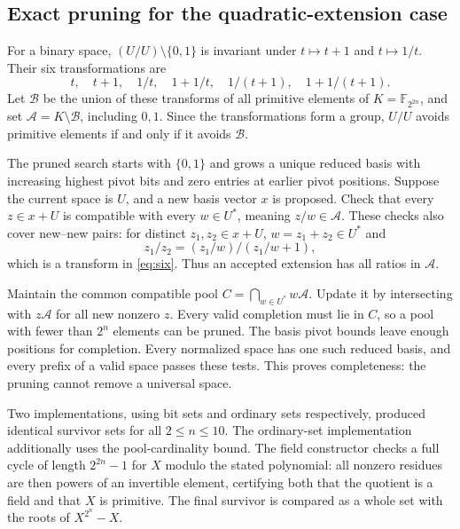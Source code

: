 \documentclass[11pt,a4paper]{article}
\theoremstyle{definition}\newtheorem{definition}[theorem]{Definition}
\theoremstyle{remark}\newtheorem{remark}[theorem]{Remark}
\newcommand{\F}{\mathbb F}
\numberwithin{equation}{section}
\begin{document}
\subsection{Exact pruning for the quadratic-extension case}
For a binary space, $(U/U)\setminus\{0,1\}$ is invariant under $t\mapsto t+1$ and $t\mapsto1/t$. Their six transformations are
\begin{equation}\label{eq:six}
t,\quad t+1,\quad1/t,\quad1+1/t,\quad1/(t+1),\quad1+1/(t+1).
\end{equation}
Let $\mathcal B$ be the union of these transforms of all primitive elements of $K=\F_{2^{2n}}$, and set $\mathcal A=K\setminus\mathcal B$, including $0,1$. Since the transformations form a group, $U/U$ avoids primitive elements if and only if it avoids $\mathcal B$.

The pruned search starts with $\{0,1\}$ and grows a unique reduced basis with increasing highest pivot bits and zero entries at earlier pivot positions. Suppose the current space is $U$, and a new basis vector $x$ is proposed. Check that every $z\in x+U$ is compatible with every $w\in U^*$, meaning $z/w\in\mathcal A$. These checks also cover new--new pairs: for distinct $z_1,z_2\in x+U$, $w=z_1+z_2\in U^*$ and
\[
z_1/z_2=(z_1/w)/(z_1/w+1),
\]
which is a transform in \eqref{eq:six}. Thus an accepted extension has all ratios in $\mathcal A$.

Maintain the common compatible pool $C=\bigcap_{w\in U^*}w\mathcal A$. Update it by intersecting with $z\mathcal A$ for all new nonzero $z$. Every valid completion must lie in $C$, so a pool with fewer than $2^n$ elements can be pruned. The basis pivot bounds leave enough positions for completion. Every normalized space has one such reduced basis, and every prefix of a valid space passes these tests. This proves completeness: the pruning cannot remove a universal space.

Two implementations, using bit sets and ordinary sets respectively, produced identical survivor sets for all $2\le n\le10$. The ordinary-set implementation additionally uses the pool-cardinality bound. The field constructor checks a full cycle of length $2^{2n}-1$ for $X$ modulo the stated polynomial: all nonzero residues are then powers of an invertible element, certifying both that the quotient is a field and that $X$ is primitive. The final survivor is compared as a whole set with the roots of $X^{2^n}-X$.
\end{document}
